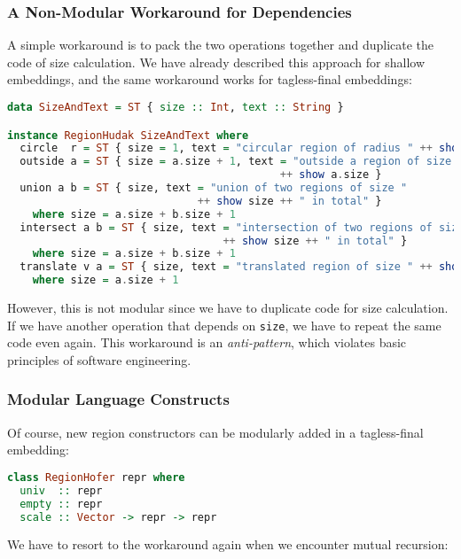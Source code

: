 \hypertarget{a-non-modular-workaround-for-dependencies}{%
\subsubsection{A Non-Modular Workaround for
Dependencies}\label{a-non-modular-workaround-for-dependencies}}

A simple workaround is to pack the two operations together and duplicate
the code of size calculation. We have already described this approach
for shallow embeddings, and the same workaround works for tagless-final
embeddings:

\begin{lstlisting}[language=Haskell,deletekeywords={union,intersect}]
data SizeAndText = ST { size :: Int, text :: String }

instance RegionHudak SizeAndText where
  circle  r = ST { size = 1, text = "circular region of radius " ++ show r }
  outside a = ST { size = a.size + 1, text = "outside a region of size "
                                           ++ show a.size }
  union a b = ST { size, text = "union of two regions of size "
                              ++ show size ++ " in total" }
    where size = a.size + b.size + 1
  intersect a b = ST { size, text = "intersection of two regions of size "
                                  ++ show size ++ " in total" }
    where size = a.size + b.size + 1
  translate v a = ST { size, text = "translated region of size " ++ show size }
    where size = a.size + 1
\end{lstlisting}
\noindent
However, this is not modular since we have to duplicate code for size
calculation. If we have another operation that depends on
\lstinline!size!, we have to repeat the same code even
again. This workaround is an \emph{anti-pattern}, which violates
basic principles of software engineering.

\hypertarget{modular-language-constructs}{%
\subsubsection{Modular Language
Constructs}\label{modular-language-constructs}}

Of course, new region constructors can be modularly added in a
tagless-final embedding:

\begin{lstlisting}[language=Haskell]
class RegionHofer repr where
  univ  :: repr
  empty :: repr
  scale :: Vector -> repr -> repr
\end{lstlisting}
\noindent
We have to resort to the workaround again when we encounter mutual
recursion:

